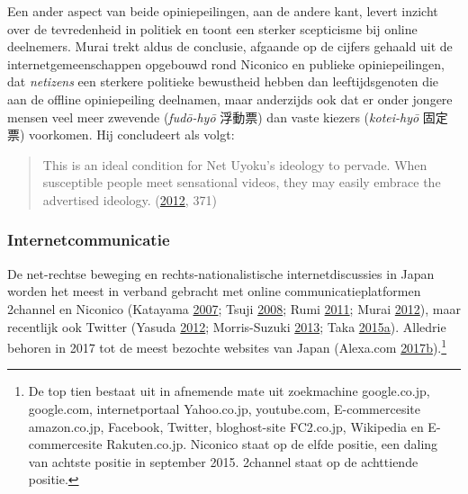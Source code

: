 \documentclass[10.5pt,dutch,]{article}
\begin{document}
Een ander aspect van beide opiniepeilingen, aan de andere kant, levert
inzicht over de tevredenheid in politiek en toont een sterker
scepticisme bij online deelnemers. Murai trekt aldus de conclusie,
afgaande op de cijfers gehaald uit de internetgemeenschappen opgebouwd
rond Niconico en publieke opiniepeilingen, dat \emph{netizens} een
sterkere politieke bewustheid hebben dan leeftijdsgenoten die aan de
offline opiniepeiling deelnamen, maar anderzijds ook dat er onder
jongere mensen veel meer zwevende (\emph{fudō-hyō} 浮動票) dan vaste
kiezers (\emph{kotei-hyō} 固定票) voorkomen. Hij concludeert als volgt:

\begin{quote}
This is an ideal condition for Net Uyoku's ideology to pervade. When
susceptible people meet sensational videos, they may easily embrace the
advertised ideology.
(\protect\hyperlink{ref-muraiux5fnetux5f2012}{2012}, 371)
\end{quote}

\subsubsection{Internetcommunicatie}\label{internetcommunicatie}

De net-rechtse beweging en rechts-nationalistische internetdiscussies in
Japan worden het meest in verband gebracht met online
communicatieplatformen 2channel en Niconico (Katayama
\protect\hyperlink{ref-katayamaux5f2-channelux5f2007}{2007}; Tsuji
\protect\hyperlink{ref-tsujiux5fintanettoux5f2008}{2008}; Rumi
\protect\hyperlink{ref-rumiux5fkoreansux5f2011}{2011}; Murai
\protect\hyperlink{ref-muraiux5fnetux5f2012}{2012}), maar recentlijk ook
Twitter (Yasuda \protect\hyperlink{ref-yasudaux5fnettoux5f2012}{2012};
Morris-Suzuki
\protect\hyperlink{ref-morris-suzukiux5ffreedomux5f2013}{2013}; Taka
\protect\hyperlink{ref-takaux5ftwitterux5f2015-1}{2015}\protect\hyperlink{ref-takaux5ftwitterux5f2015-1}{a}).
Alledrie behoren in 2017 tot de meest bezochte websites van Japan
(Alexa.com
\protect\hyperlink{ref-alexa.comux5ftopux5f2017}{2017}\protect\hyperlink{ref-alexa.comux5ftopux5f2017}{b}).\footnote{De
  top tien bestaat uit in afnemende mate uit zoekmachine google.co.jp,
  google.com, internetportaal Yahoo.co.jp, youtube.com, E-commercesite
  amazon.co.jp, Facebook, Twitter, bloghost-site FC2.co.jp, Wikipedia en
  E-commercesite Rakuten.co.jp. Niconico staat op de elfde positie, een
  daling van achtste positie in september 2015. 2channel staat op de
  achttiende positie.}
\end{document}
